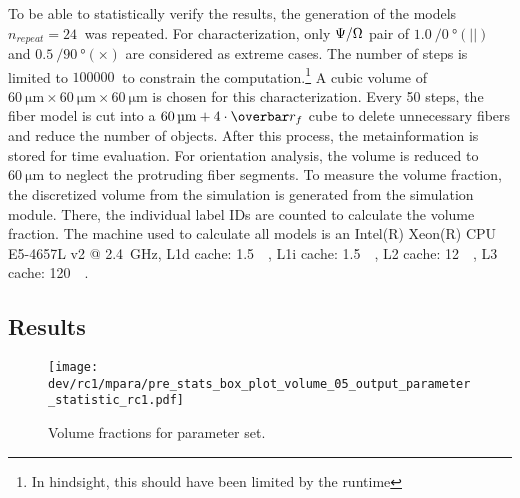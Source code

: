 %
To be able to statistically verify the results, the generation of the models $n_{\mathit{repeat}} = \SI{24}{}$ was repeated.
For characterization, only $\textnormal{$\Psi$}/\textnormal{$\Omega$}$ pair of $\SI{1.0}{}/\SI{0}{\degree}(||)$ and $\SI{0.5}{}/\SI{90}{\degree}(\times)$ are considered as extreme cases.
The number of steps is limited to $\SI{100000}{}$ to constrain the computation.\footnote{In hindsight, this should have been limited by the runtime}
A cubic volume of $\SI{60}{\micro\meter} \times \SI{60}{\micro\meter} \times \SI{60}{\micro\meter}$ is chosen for this characterization.
Every 50 steps, the fiber model is cut into a $\SI{60}{\micro\meter}+4 \cdot \fiberRadiusMean$ cube to delete unnecessary fibers and reduce the number of objects.
After this process, the metainformation is stored for time evaluation.
For orientation analysis, the volume is reduced to $\SI{60}{\micro\meter}$ to neglect the protruding fiber segments.
To measure the volume fraction, the discretized volume from the simulation is generated from the simulation module.
There, the individual label IDs are counted to calculate the volume fraction.
The machine used to calculate all models is an
Intel(R) Xeon(R) CPU E5-4657L v2 @ \SI{2.4}{\giga\hertz}, L1d cache: \SI{1.5}{\mega\byte}, L1i cache: \SI{1.5}{\mega\byte}, L2 cache: \SI{12}{\mega\byte}, L3 cache: \SI{120}{\mega\byte}.
%
%
%
\subsection{Results} \label{sec:solverParameterResults}
%
\begin{figure}[t]
\centering
\texttt{[image: dev/rc1/mpara/pre\_stats\_box\_plot\_volume\_05\_output\_parameter\_statistic\_rc1.pdf]}
\caption[Volume fraction]{Volume fractions for parameter set.}
\label{fig:psbp1}
\end{figure}
%
